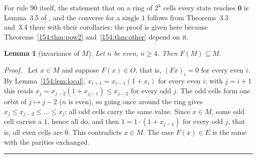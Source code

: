 \documentclass[10pt,a4paper]{article}
\newtheorem{lemma}[theorem]{Lemma}
\newcommand{\qedmark}{\rule{1.1ex}{1.1ex}}
\newenvironment{proof}[1][Proof]{\par\smallskip\noindent\textit{#1.}\ }{\hfill\qedmark\par\smallskip}
\newcommand{\zero}{\mathbf{0}}                %
\begin{document}
For rule 90 itself, the statement that on a ring of $2^k$ cells every state reaches $\zero$ is Lemma~3.5 of
\cite{MartinOdlyzkoWolfram1984}, and the converse for a single $1$ follows from Theorems~3.3 and~3.4 there with their corollaries; the
proof is given here because Theorems~\ref{154:thm:pow2} and~\ref{154:thm:other} depend on it.

\begin{lemma}[invariance of $M$]\label{154:lem:invariant}
Let $n$ be even, $n\ge 4$. Then $F(M)\subseteq M$.
\end{lemma}
\begin{proof}
Let $x\in M$ and suppose $F(x)\in O$, that is, $(Fx)_i=0$ for every even $i$. By Lemma~\ref{154:lem:local},
$x_{i+1}=x_{i-1}(1+x_i)$ for every even $i$; with $j=i+1$ this reads $x_j=x_{j-2}(1+x_{j-1})\le x_{j-2}$ for every
odd $j$. The odd cells form one orbit of $j\mapsto j-2$ ($n$ is even), so going once around the ring gives
$x_j\le x_{j-2}\le\dots\le x_j$: all odd cells carry the same value. Since $x\in M$, some odd cell carries a $1$,
hence all do, and then $1=1\cdot(1+x_{j-1})$ for every odd $j$, that is, all even cells are $0$. This contradicts
$x\in M$. The case $F(x)\in E$ is the same with the parities exchanged.
\end{proof}
\end{document}
